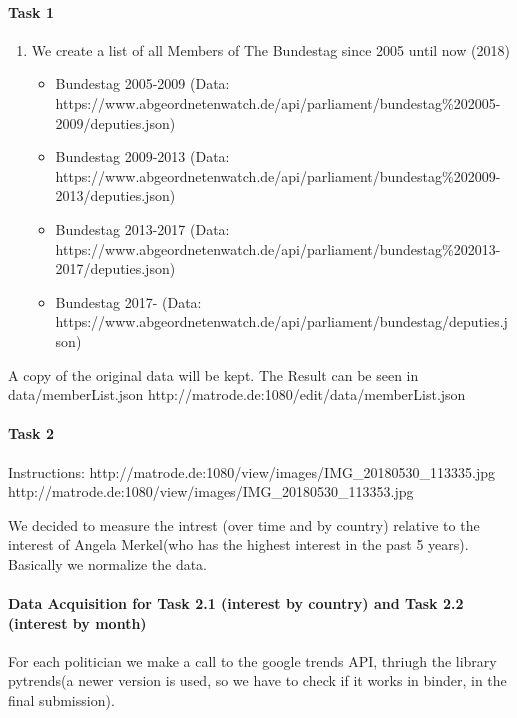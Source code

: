 \documentclass[11pt]{article}
\providecommand{\tightlist}{%
      \setlength{\itemsep}{0pt}\setlength{\parskip}{0pt}}
\begin{document}
\paragraph{Task 1}\label{task-1}

\begin{enumerate}
\def\labelenumi{\arabic{enumi}.}
\tightlist
\item
  We create a list of all Members of The Bundestag since 2005 until now
  (2018)

  \begin{itemize}
  \tightlist
  \item
    Bundestag 2005-2009 (Data:
    https://www.abgeordnetenwatch.de/api/parliament/bundestag\%202005-2009/deputies.json)
  \item
    Bundestag 2009-2013 (Data:
    https://www.abgeordnetenwatch.de/api/parliament/bundestag\%202009-2013/deputies.json)
  \item
    Bundestag 2013-2017 (Data:
    https://www.abgeordnetenwatch.de/api/parliament/bundestag\%202013-2017/deputies.json)
  \item
    Bundestag 2017- (Data:
    https://www.abgeordnetenwatch.de/api/parliament/bundestag/deputies.json)
  \end{itemize}
\end{enumerate}

A copy of the original data will be kept. The Result can be seen in
data/memberList.json http://matrode.de:1080/edit/data/memberList.json

\paragraph{Task 2}\label{task-2}

Instructions:
http://matrode.de:1080/view/images/IMG\_20180530\_113335.jpg
http://matrode.de:1080/view/images/IMG\_20180530\_113353.jpg

We decided to measure the intrest (over time and by country) relative to
the interest of Angela Merkel(who has the highest interest in the past 5
years). Basically we normalize the data.

\paragraph{Data Acquisition for Task 2.1 (interest by country) and Task
2.2 (interest by
month)}\label{data-acquisition-for-task-2.1-interest-by-country-and-task-2.2-interest-by-month}

For each politician we make a call to the google trends API, thriugh the
library pytrends(a newer version is used, so we have to check if it
works in binder, in the final submission).
\end{document}
